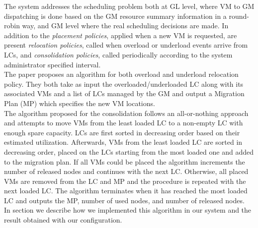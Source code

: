 The system addresses the scheduling problem both at GL level, where VM to GM dispatching is done based on the GM resource summary information in a round-robin way, and GM level where the real scheduling decisions are made. In addition to the \textit{placement policies}, applied when a new VM is requested, are present \textit{relocation policies}, called when overload or underload events arrive from LCs, and \textit{consolidation policies}, called periodically according to the system administrator specified interval.\\
The paper proposes an algorithm for both overload and underload relocation policy. They both take as input the overloaded/underloaded LC along with its associated VMs and a list of LCs managed by the GM and output a Migration Plan (MP) which specifies the new VM locations.\\
The algorithm proposed for the consolidation follows an all-or-nothing approach and attempts to move VMs from the least loaded LC to a non-empty LC with enough spare capacity.  LCs are first sorted in decreasing order based on their estimated utilization. Afterwards, VMs from the least loaded LC are sorted in decreasing order, placed on the LCs starting from the most loaded one and added to the migration plan. If all VMs could be placed the algorithm increments the number of released nodes and continues with the next LC. Otherwise, all placed VMs are removed from the LC and MP and the procedure is repeated with the next loaded LC. The algorithm terminates when it has reached the most loaded LC and outputs the MP, number of used nodes, and number of released nodes\cite[p.~208]{Feller:2012kf}.\\
In section  we describe how we implemented this algorithm in our system and the result obtained with our configuration.


